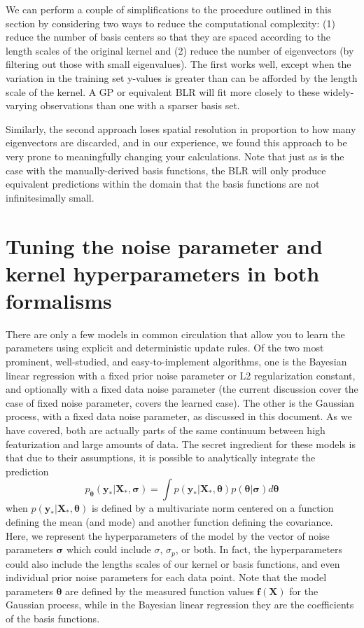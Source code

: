 \documentclass{article}
\begin{document}
We can perform a couple of simplifications to the procedure outlined in this section by considering two ways to reduce the computational complexity: (1) reduce the number of basis centers so that they are spaced according to the length scales of the original kernel and (2) reduce the number of eigenvectors (by filtering out those with small eigenvalues). The first works well, except when the variation in the training set y-values is greater than can be afforded by the length scale of the kernel. A GP or equivalent BLR will fit more closely to these widely-varying observations than one with a sparser basis set. 

Similarly, the second approach loses spatial resolution in proportion to how many eigenvectors are discarded, and in our experience, we found this approach to be very prone to meaningfully changing your calculations. Note that just as is the case with the manually-derived basis functions, the BLR will only produce equivalent predictions within the domain that the basis functions are not infinitesimally small.

\section{Tuning the noise parameter and kernel hyperparameters in both formalisms}\label{sec:hyperparameter_tuning}

There are only a few models in common circulation that allow you to learn the parameters using explicit and deterministic update rules. Of the two most prominent, well-studied, and easy-to-implement algorithms, one is the Bayesian linear regression with a fixed prior noise parameter or L2 regularization constant, and optionally with a fixed data noise parameter (the current discussion cover the case of fixed noise parameter, \cite{KoyoteScience} covers the learned case). The other is the Gaussian process, with a fixed data noise parameter, as discussed in this document. As we have covered, both are actually parts of the same continuum between high featurization and large amounts of data.  The secret ingredient for these models is that due to their assumptions, it is possible to analytically integrate the prediction 
\begin{equation}
    p_{\boldsymbol{\theta}}(\mathbf{y}_\ast|\mathbf{X}_\ast,\boldsymbol{\sigma}) = \int p(\mathbf{y}_\ast|\mathbf{X}_\ast,\boldsymbol{\theta})p(\boldsymbol{\theta}|\boldsymbol{\sigma})d\boldsymbol{\theta}
\end{equation}when $p(\mathbf{y}_\ast|\mathbf{X}_\ast,\boldsymbol{\theta})$ is defined by a multivariate norm centered on a function defining the mean (and mode) and another function defining the covariance. Here, we represent the hyperparameters of the model by the vector of noise parameters $\boldsymbol{\sigma}$ which could include $\sigma$, $\sigma_p$, or both. In fact, the hyperparameters could also include the lengths scales of our kernel or basis functions, and even individual prior noise parameters for each data point. Note that the model parameters $\boldsymbol{\theta}$ are defined by the measured function values $\mathbf{f}(\mathbf{X})$ for the Gaussian process, while in the Bayesian linear regression they are the coefficients of the basis functions.  
\end{document}
